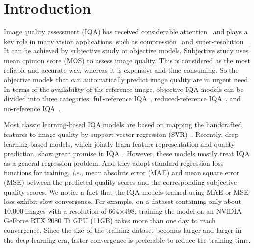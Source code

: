 \documentclass[sigconf]{acmart}
\begin{document}

\maketitle

\section{Introduction}
\label{sec:introduction}

Image quality assessment (IQA) has received considerable attention~\cite{wang2004image,mittal2012no,ye2012unsupervised,kang2014convolutional,ma2016group,hosu2019koniq} and plays a key role in many vision applications, such as compression~\cite{rippel2019learned} and super-resolution~\cite{zhang2019ranksrgan}.
It can be achieved by subjective study or objective models. 
Subjective study uses mean opinion score (MOS) to assess image quality.
This is considered as the most reliable and accurate way, whereas it is expensive and time-consuming.
So the objective models that can automatically predict image quality are in urgent need.
In terms of the availability of the reference image, objective IQA models can be divided into three categories: full-reference IQA~\cite{wang2004image,zhang2014vsi,kim2017deep0,bosse2018deep}, reduced-reference IQA~\cite{ma2011reduced,xu2015fractal,bampis2017speed,liu2018reduced}, and no-reference IQA~\cite{mittal2012no,kang2014convolutional,liu2017rankiqa,ren2018ran4iqa}.

Most classic learning-based IQA models are based on mapping the handcrafted features to image quality by support vector regression (SVR)~\cite{mittal2012no}.
Recently, deep learning-based models, which jointly learn feature representation and quality prediction, show great promise in IQA~\cite{kang2014convolutional,ren2018ran4iqa,lin2018hallucinated,hosu2019koniq}.
However, these models mostly treat IQA as a general regression problem.
And they adopt standard regression loss functions for training, \textit{i.e.}, mean absolute error (MAE) and mean square error (MSE) between the predicted quality scores and the corresponding subjective quality scores.
We notice a fact that the IQA models trained using MAE or MSE loss exhibit slow convergence. 
For example, on a dataset containing only about 10,000 images with a resolution of 664$\times$498, training the model on an NVIDIA GeForce RTX 2080 Ti GPU (11GB) takes more than one day to reach convergence.
Since the size of the training dataset becomes larger and larger in the deep learning era, faster convergence is preferable to reduce the training time.
\end{document}
